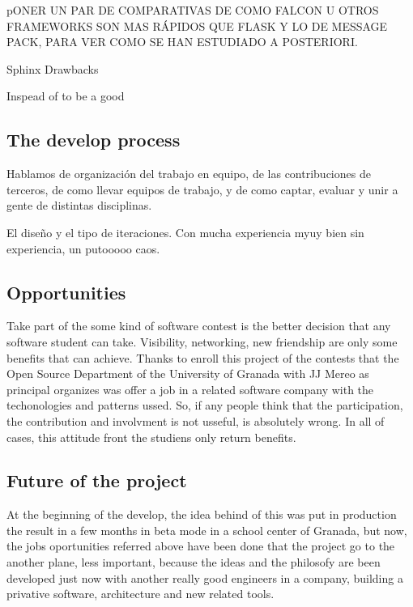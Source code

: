 pONER UN PAR DE COMPARATIVAS DE COMO FALCON U OTROS FRAMEWORKS SON MAS RÁPIDOS
QUE FLASK Y LO DE MESSAGE PACK, PARA VER COMO SE HAN ESTUDIADO A POSTERIORI.



Sphinx Drawbacks

  Inspead of to be a good

\subsection{The develop process}

Hablamos de organización del trabajo en equipo, de las contribuciones de terceros,
de como llevar equipos de trabajo, y de como captar, evaluar y unir a gente de
distintas disciplinas.

El diseño y el tipo de iteraciones. Con mucha experiencia myuy bien
sin experiencia, un putooooo caos.



\subsection{Opportunities}

Take part of the some kind of software contest is the better decision that any
software student can take. Visibility, networking, new friendship are only some
benefits that can achieve.
Thanks to enroll this project of the contests that the Open Source Department of
 the University of Granada with JJ Mereo as principal organizes was offer a job
 in a related software company with the techonologies and patterns ussed.
So, if any people think that the participation, the contribution and involvment
is not usseful, is absolutely wrong. In all of cases, this attitude front the
studiens only return benefits.

\subsection{Future of the project}

At the beginning of the develop, the idea behind of this was put in production
the result in a few months in beta mode in a school center of Granada, but now,
the jobs oportunities referred above have been done that the project go to the
another plane, less important, because the ideas and the philosofy are been
developed just now with another really good engineers in a company, building a
privative software, architecture and new related tools.

